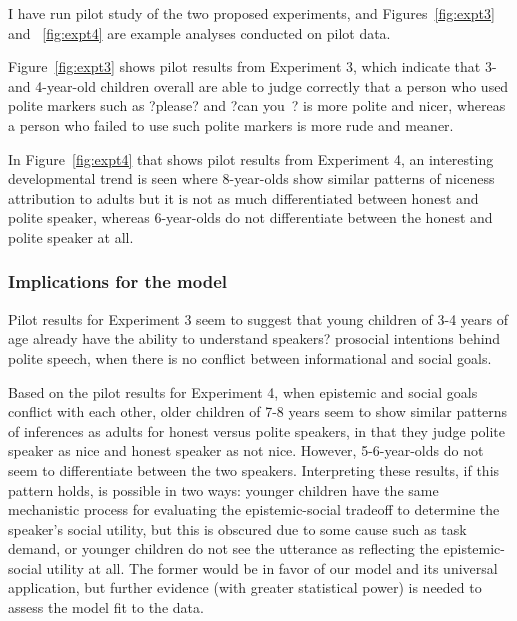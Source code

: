 I have run pilot study of the two proposed experiments, and Figures~\ref{fig:expt3} and ~\ref{fig:expt4} are example analyses conducted on pilot data. 

Figure~\ref{fig:expt3} shows pilot results from Experiment 3, which indicate that 3- and 4-year-old children overall are able to judge correctly that a person who used polite markers such as ?please? and ?can you~? is more polite and nicer, whereas a person who failed to use such polite markers is more rude and meaner.

In Figure~\ref{fig:expt4} that shows pilot results from Experiment 4, an interesting developmental trend is seen where 8-year-olds show similar patterns of niceness attribution to adults but it is not as much differentiated between honest and polite speaker, whereas 6-year-olds do not differentiate between the honest and polite speaker at all.

\subsubsection{Implications for the model}

Pilot results for Experiment 3 seem to suggest that young children of 3-4 years of age already have the ability to understand speakers? prosocial intentions behind polite speech, when there is no conflict between informational and social goals. 

Based on the pilot results for Experiment 4, when epistemic and social goals conflict with each other, older children of 7-8 years seem to show similar patterns of inferences as adults for honest versus polite speakers, in that they judge polite speaker as nice and honest speaker as not nice. However,  5-6-year-olds do not seem to differentiate between the two speakers. Interpreting these results, if this pattern holds, is possible in two ways: younger children have the same mechanistic process for evaluating the epistemic-social tradeoff to determine the speaker's social utility, but this is obscured due to some cause such as task demand, or younger children do not see the utterance as reflecting the epistemic-social utility at all. The former would be in favor of our model and its universal application, but further evidence (with greater statistical power) is needed to assess the model fit to the data.



